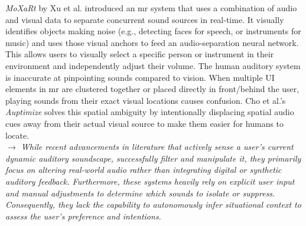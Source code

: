 \textit{MoXaRt} by Xu et al. \cite{Xu_26_TargetAudioXR} introduced an \gls{mr} system that uses a combination of audio and visual data to separate concurrent sound sources in real-time. It visually identifies objects making noise (e.g., detecting faces for speech, or instruments for music) and uses those visual anchors to feed an audio-separation neural network. This allows users to visually select a specific person or instrument in their environment and independently adjust their volume. %
The human auditory system is inaccurate at pinpointing sounds compared to vision. When multiple UI elements in \gls{mr} are clustered together or placed directly in front/behind the user, playing sounds from their exact visual locations causes confusion. Cho et al.'s \cite{Cho_24_Auptimize} \textit{Auptimize} solves this spatial ambiguity by intentionally displacing spatial audio cues away from their actual visual source to make them easier for humans to locate. %
\\

\textit{$\rightarrow$ While recent advancements in literature that actively sense a user’s current dynamic auditory soundscape, successfully filter and manipulate it, they primarily focus on altering real-world audio rather than integrating digital or synthetic auditory feedback. Furthermore, these systems heavily rely on explicit user input and manual adjustments to determine which sounds to isolate or suppress. Consequently, they lack the capability to autonomously infer situational context to assess the user’s preference and intentions.}


